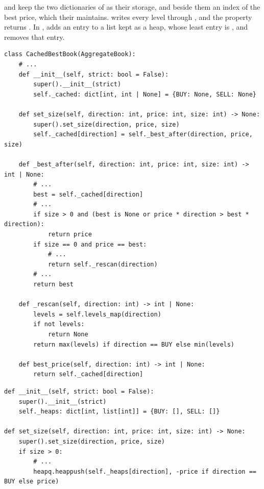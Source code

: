 \begin{question}
\label{question.bypassedWritesOnThreeBooks}
 and  keep the two dictionaries of 
as their storage, and beside them an index of the best price, which their  maintains.
 writes every level through ,
and the property  returns .
In ,  adds an entry to a list kept as a heap,
whose least entry is ,
and  removes that entry.
\begin{lstlisting}[caption={\protect\codehl{unito26.lob.orderbook.CachedBestBook}, abridged: its docstrings and comments are cut.}, label=listing.bypassedWritesOnThreeBooksCached]
class CachedBestBook(AggregateBook):
    # ...
    def __init__(self, strict: bool = False):
        super().__init__(strict)
        self._cached: dict[int, int | None] = {BUY: None, SELL: None}

    def set_size(self, direction: int, price: int, size: int) -> None:
        super().set_size(direction, price, size)
        self._cached[direction] = self._best_after(direction, price, size)

    def _best_after(self, direction: int, price: int, size: int) -> int | None:
        # ...
        best = self._cached[direction]
        # ...
        if size > 0 and (best is None or price * direction > best * direction):
            return price
        if size == 0 and price == best:
            # ...
            return self._rescan(direction)
        # ...
        return best

    def _rescan(self, direction: int) -> int | None:
        levels = self.levels_map(direction)
        if not levels:
            return None
        return max(levels) if direction == BUY else min(levels)

    def best_price(self, direction: int) -> int | None:
        return self._cached[direction]
\end{lstlisting}
\begin{lstlisting}[caption={\protect\codehl{unito26.lob.orderbook.HeapBook}: the constructor, the write and the best price, a comment cut.}, label=listing.bypassedWritesOnThreeBooksHeap]
def __init__(self, strict: bool = False):
    super().__init__(strict)
    self._heaps: dict[int, list[int]] = {BUY: [], SELL: []}

def set_size(self, direction: int, price: int, size: int) -> None:
    super().set_size(direction, price, size)
    if size > 0:
        # ...
        heapq.heappush(self._heaps[direction], -price if direction == BUY else price)


\end{lstlisting}
\end{question}
